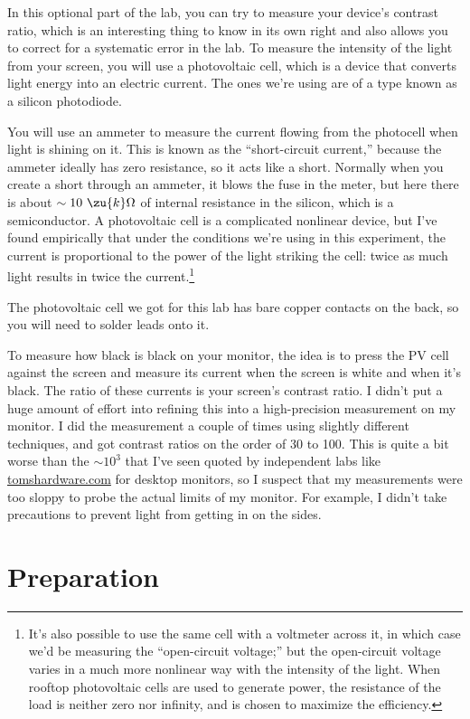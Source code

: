 In this optional part of the lab, you can try to measure your device's contrast ratio,
which is an interesting thing to know in its own right and also allows you to correct for
a systematic error in the lab.
To measure the intensity of the light from your screen,
you will use a photovoltaic cell, which is a device
that converts light energy into an electric current. The ones we're
using are of a type known as a silicon photodiode.

You will use an ammeter to measure the current flowing from the
photocell when light is shining on it. This is known as the ``short-circuit current,''
because the ammeter ideally has zero resistance, so it acts like a short. Normally when
you create a short through an ammeter, it blows the fuse in the meter, but here there
is about $\sim10\ \zu{k}\Omega$ of internal resistance in the silicon, which is a semiconductor.
A photovoltaic cell is
a complicated nonlinear device, but I've found empirically
that under the conditions we're using in this experiment,
the current is proportional to the power of the light striking
the cell: twice as much light results in twice 
the current.\footnote{It's also possible to use the same cell with a voltmeter across it, in which case we'd be
measuring the ``open-circuit voltage;'' but the open-circuit voltage varies in a much
more nonlinear way with the intensity of the light. When rooftop photovoltaic cells are used
to generate power, the resistance of the load is neither zero nor infinity, and is chosen
to maximize the efficiency.}

The photovoltaic cell we got for this lab has bare copper contacts on the back, so you will
need to solder leads onto it.

To measure how black is black on your monitor, the idea is to press the PV cell against
the screen and measure its current when the screen is white and when it's black.
The ratio of these currents is your screen's contrast ratio. I didn't put a huge amount
of effort into refining this into a high-precision measurement on my monitor. I did
the measurement a couple of times using slightly different techniques, and got
contrast ratios on the order of 30 to 100. This is quite a bit worse than the $\sim10^3$ that
I've seen quoted by independent labs like \url{tomshardware.com} for desktop monitors,
so I suspect that my measurements were too sloppy to probe the actual limits of my monitor.
For example, I didn't take precautions to prevent light from getting in on the sides.

\section*{Preparation}

